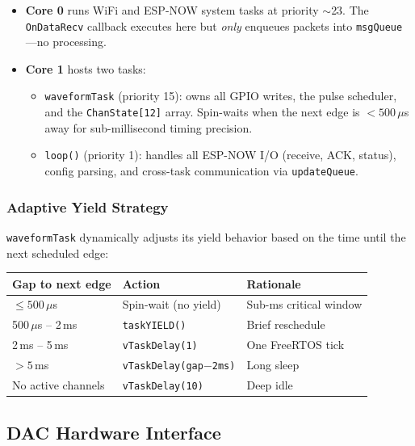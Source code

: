 \documentclass[11pt,a4paper]{article}
\begin{document}
\begin{itemize}
  \item \textbf{Core 0} runs WiFi and ESP-NOW system tasks at priority $\sim$23. The
    \texttt{OnDataRecv} callback executes here but \emph{only} enqueues packets
    into \texttt{msgQueue}---no processing.

  \item \textbf{Core 1} hosts two tasks:
    \begin{itemize}
      \item \texttt{waveformTask} (priority 15): owns all GPIO writes, the pulse
        scheduler, and the \texttt{ChanState[12]} array. Spin-waits when the
        next edge is $< 500\,\mu$s away for sub-millisecond timing precision.
      \item \texttt{loop()} (priority 1): handles all ESP-NOW I/O (receive,
        ACK, status), config parsing, and cross-task communication via
        \texttt{updateQueue}.
    \end{itemize}
\end{itemize}

\subsubsection{Adaptive Yield Strategy}

\texttt{waveformTask} dynamically adjusts its yield behavior based on
the time until the next scheduled edge:

\begin{center}
\begin{tabular}{lll}
\toprule
\textbf{Gap to next edge} & \textbf{Action} & \textbf{Rationale} \\
\midrule
$\leq 500\,\mu$s     & Spin-wait (no yield)  & Sub-ms critical window \\
500\,$\mu$s -- 2\,ms  & \texttt{taskYIELD()}  & Brief reschedule \\
2\,ms -- 5\,ms        & \texttt{vTaskDelay(1)} & One FreeRTOS tick \\
$> 5$\,ms             & \texttt{vTaskDelay(gap$-$2ms)} & Long sleep \\
No active channels    & \texttt{vTaskDelay(10)} & Deep idle \\
\bottomrule
\end{tabular}
\end{center}

\subsection{DAC Hardware Interface}
\end{document}
